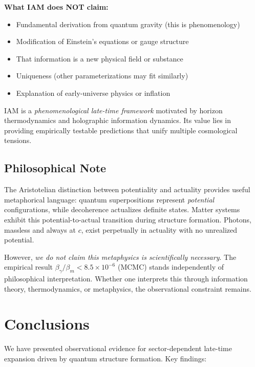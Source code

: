 \documentclass[twocolumn,superscriptaddress,prl,amsmath,amssymb]{revtex4-2}
\begin{document}
\textbf{What IAM does NOT claim:}
\begin{itemize}
\item Fundamental derivation from quantum gravity (this is phenomenology)
\item Modification of Einstein's equations or gauge structure
\item That information is a new physical field or substance
\item Uniqueness (other parameterizations may fit similarly)
\item Explanation of early-universe physics or inflation
\end{itemize}

IAM is a \textit{phenomenological late-time framework} motivated by horizon thermodynamics and holographic information dynamics. Its value lies in providing empirically testable predictions that unify multiple cosmological tensions.

\subsection{Philosophical Note}

The Aristotelian distinction between potentiality and actuality provides useful metaphorical language: quantum superpositions represent \textit{potential} configurations, while decoherence actualizes definite states. Matter systems exhibit this potential-to-actual transition during structure formation. Photons, massless and always at $c$, exist perpetually in actuality with no unrealized potential.

However, \textit{we do not claim this metaphysics is scientifically necessary}. The empirical result $\beta_\gamma/\beta_m < 8.5 \times 10^{-6}$ (MCMC) stands independently of philosophical interpretation. Whether one interprets this through information theory, thermodynamics, or metaphysics, the observational constraint remains.

\section{Conclusions}

We have presented observational evidence for sector-dependent late-time expansion driven by quantum structure formation. Key findings:
\end{document}

